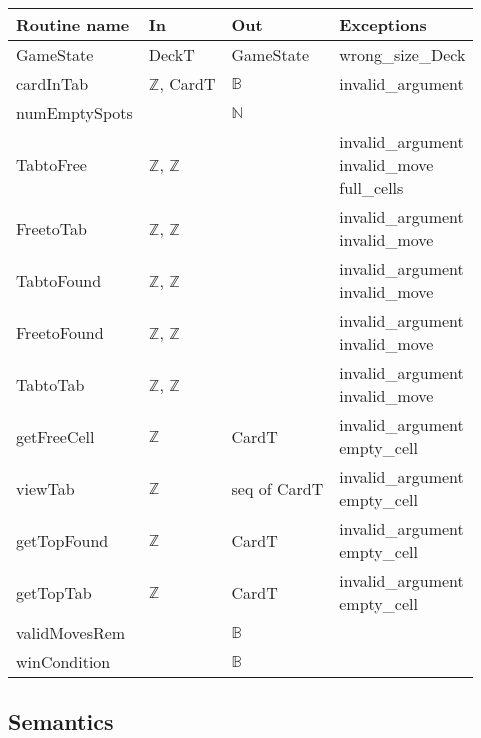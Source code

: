 \documentclass[12pt]{article}
\begin{document}
\begin{tabular}{| l | l | l | l |}
\hline
\textbf{Routine name} & \textbf{In} & \textbf{Out} & \textbf{Exceptions}\\
\hline
GameState &  DeckT & GameState & wrong\_size\_Deck\\
\hline
cardInTab & $\mathbb{Z}$, CardT & $\mathbb{B}$ &  invalid\_argument\\
\hline
numEmptySpots & & $\mathbb{N}$&\\
\hline
TabtoFree & $\mathbb{Z}$, $\mathbb{Z}$ & &\makecell{invalid\_argument \\ invalid\_move \\ full\_cells}\\
\hline
FreetoTab & $\mathbb{Z}$, $\mathbb{Z}$ & &\makecell{invalid\_argument \\ invalid\_move  }\\
\hline
TabtoFound & $\mathbb{Z}$, $\mathbb{Z}$ & &\makecell{invalid\_argument \\ invalid\_move}\\
\hline
FreetoFound & $\mathbb{Z}$, $\mathbb{Z}$ & &\makecell{invalid\_argument \\ invalid\_move }\\
\hline
TabtoTab & $\mathbb{Z}$, $\mathbb{Z}$ & &\makecell{invalid\_argument \\ invalid\_move}\\
\hline
getFreeCell & $\mathbb{Z}$ & CardT & \makecell{invalid\_argument \\ empty\_cell}\\
\hline
viewTab & $\mathbb{Z}$ & seq of CardT & \makecell{invalid\_argument \\ empty\_cell}\\
\hline
getTopFound & $\mathbb{Z}$ & CardT & \makecell{invalid\_argument \\ empty\_cell}\\
\hline
getTopTab & $\mathbb{Z}$ & CardT & \makecell{invalid\_argument \\ empty\_cell}\\
\hline
validMovesRem & &$\mathbb{B}$ &\\ 
\hline
winCondition & & $\mathbb{B}$ &\\
\hline
\end{tabular}

\subsection* {Semantics}
\end{document}
